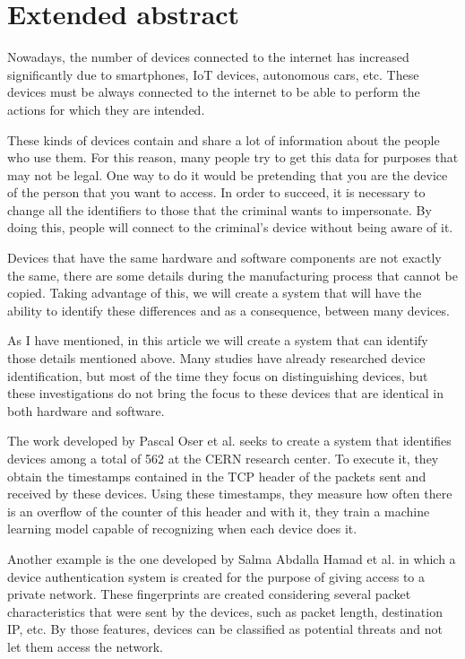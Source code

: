 
\chapter*{Extended abstract}

Nowadays, the number of devices connected to the internet has increased significantly due to smartphones, IoT devices, autonomous cars, etc. These devices must be always connected to the internet to be able to perform the actions for which they are intended. 


These kinds of devices contain and share a lot of information about the people who use them. For this reason, many people try to get this data for purposes that may not be legal. One way to do it would be pretending that you are the device of the person that you want to access. In order to succeed, it is necessary to change all the identifiers to those that the criminal wants to impersonate. By doing this, people will connect to the criminal's device without being aware of it.


Devices that have the same hardware and software components are not exactly the same, there are some details during the manufacturing process that cannot be copied. Taking advantage of this, we will create a system that will have the ability to identify these differences and as a consequence, between many devices.


As I have mentioned, in this article we will create a system that can identify those details mentioned above. Many studies have already researched device identification, but most of the time they focus on distinguishing devices, but these investigations do not bring the focus to these devices that are identical in both hardware and software. 


The work developed by Pascal Oser et al. \cite{oser2018identifying} seeks to create a system that identifies devices among a total of 562 at the CERN research center. To execute it, they obtain the timestamps contained in the TCP header of the packets sent and received by these devices. Using these timestamps, they measure how often there is an overflow of the counter of this header and with it, they train a machine learning model capable of recognizing when each device does it.


Another example is the one developed by Salma Abdalla Hamad et al. \cite{hamad2019iot} in which a device authentication system is created for the purpose of giving access to a private network. These fingerprints are created considering several packet characteristics that were sent by the devices, such as packet length, destination IP, etc. By those features, devices can be classified as potential threats and not let them access the network. 



